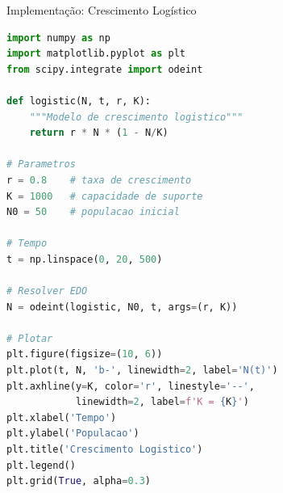 \begin{frame}[fragile]{Implementação: Crescimento Logístico}
\begin{lstlisting}[language=Python, caption=Modelo logístico em Python]
import numpy as np
import matplotlib.pyplot as plt
from scipy.integrate import odeint

def logistic(N, t, r, K):
    """Modelo de crescimento logistico"""
    return r * N * (1 - N/K)

# Parametros
r = 0.8    # taxa de crescimento
K = 1000   # capacidade de suporte
N0 = 50    # populacao inicial

# Tempo
t = np.linspace(0, 20, 500)

# Resolver EDO
N = odeint(logistic, N0, t, args=(r, K))

# Plotar
plt.figure(figsize=(10, 6))
plt.plot(t, N, 'b-', linewidth=2, label='N(t)')
plt.axhline(y=K, color='r', linestyle='--',
            linewidth=2, label=f'K = {K}')
plt.xlabel('Tempo')
plt.ylabel('Populacao')
plt.title('Crescimento Logistico')
plt.legend()
plt.grid(True, alpha=0.3)
\end{lstlisting}
\end{frame}

